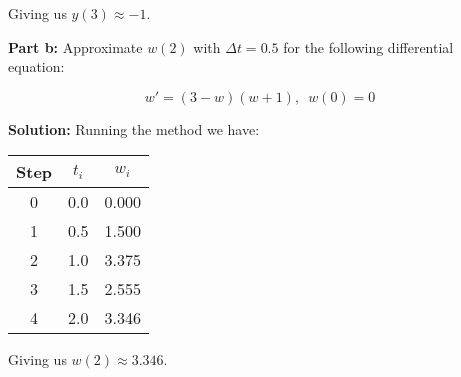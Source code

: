 \documentclass{article}
\begin{document}
Giving us $y(3)\approx-1$.

\bigskip

\noindent\textbf{Part b:} Approximate $w(2)$ with $\Delta t=0.5$ for the following differential equation:

\begin{equation*}
    w'=(3-w)(w+1),\,\,\,w(0)=0
\end{equation*}
\smallskip

\noindent\textbf{Solution:} Running the method we have:

\begin{center}
\begin{tabular}{c|c|c}
        Step & $t_i$ & $w_i$\\
        \hline
        0 & 0.0 & 0.000\\
        1 & 0.5 & 1.500\\
        2 & 1.0 & 3.375\\
        3 & 1.5 & 2.555\\
        4 & 2.0 & 3.346\\
\end{tabular}
\end{center}

Giving us $w(2)\approx3.346$.
\end{document}
